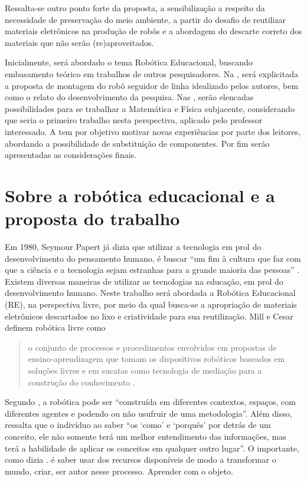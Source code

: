 \documentclass{textolivre}
\begin{document}
Ressalta-se outro ponto forte da proposta, a sensibilização a respeito da
necessidade de preservação do meio ambiente, a partir do desafio de reutilizar
materiais eletrônicos na produção de robôs e a abordagem do descarte correto
dos materiais que não serão (re)aproveitados.

Inicialmente, será abordado o tema Robótica Educacional, buscando embasamento
teórico em trabalhos de outros pesquisadores. Na , será explicitada a
proposta de montagem do robô seguidor de linha idealizado pelos autores, bem
como o relato do desenvolvimento da pesquisa. Nas , serão elencadas
possibilidades para se trabalhar a Matemática e Física subjacente, considerando
que seria o primeiro trabalho nesta perspectiva, aplicado pelo professor
interessado. A  tem por objetivo motivar novas experiências por parte
dos leitores, abordando a possibilidade de substituição de componentes. Por fim
serão apresentadas as considerações finais.



\section{Sobre a robótica educacional e a proposta do trabalho}\label{sec-robotica}
Em 1980, Seymour Papert já dizia que utilizar a tecnologia em prol do
desenvolvimento do pensamento humano, é buscar “um fim à cultura que faz com
que a ciência e a tecnologia sejam estranhas para a grande maioria das pessoas”
\cite[p. 4, tradução nossa]{papert1980}. Existem diversas maneiras de utilizar as
tecnologias na educação, em prol do desenvolvimento humano. Neste trabalho será
abordada a Robótica Educacional (RE), na perspectiva livre, por meio da qual
busca-se a apropriação de materiais eletrônicos descartados no lixo e
criatividade para sua reutilização. Mill e Cesar definem robótica livre como
\begin{quote}
o conjunto de processos e procedimentos envolvidos em propostas de
ensino-aprendizagem que tomam os dispositivos robóticos baseados
em soluções livres e em sucatas como tecnologia de mediação para a
construção do conhecimento \cite[p. 222]{mill2009}.
\end{quote}

Segundo \textcite[p. 71]{barbosa2016}, a robótica pode ser “construída em diferentes
contextos, espaços, com diferentes agentes e podendo ou não usufruir de uma
metodologia”. Além disso, \textcite[p. 60]{campos2005} ressalta que o indivíduo ao
saber “os ‘como’ e ‘porquês’ por detrás de um conceito, ele não somente terá um
melhor entendimento das informações, mas terá a habilidade de aplicar os
conceitos em qualquer outro lugar”. O importante, como dizia \textcite[p. 44]{barbosa2016}.
é saber usar dos recursos disponíveis de modo a transformar o mundo, criar,
ser autor nesse processo. Aprender com o objeto.
\end{document}
